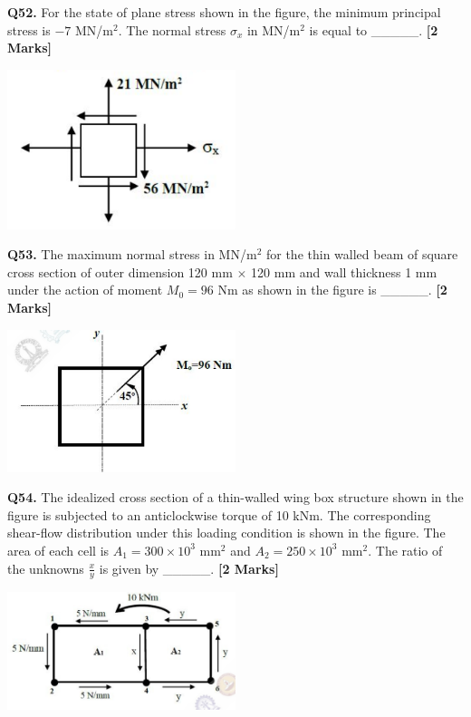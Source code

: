 \documentclass[11pt]{article}
\newcommand{\questionb}[2]{
    \noindent\textbf{Q#2.} #1 \hfill \textbf{[2 Marks]}
}
\begin{document}
\questionb{For the state of plane stress shown in the figure, the minimum principal stress is $-7$ MN/m$^2$. The normal stress $\sigma_x$ in MN/m$^2$ is equal to \_\_\_\_\_.}{52}
\begin{center}
\includegraphics[width=0.5\textwidth]{figures/52.png}
\end{center}

\vspace{0.5cm}

\questionb{The maximum normal stress in MN/m$^2$ for the thin walled beam of square cross section of outer dimension 120 mm $\times$ 120 mm and wall thickness 1 mm under the action of moment $M_0=96$ Nm as shown in the figure is \_\_\_\_\_.}{53}
\begin{center}
\includegraphics[width=0.5\textwidth]{figures/53.png}
\end{center}

\vspace{0.5cm}

\questionb{The idealized cross section of a thin-walled wing box structure shown in the figure is subjected to an anticlockwise torque of 10 kNm. The corresponding shear-flow distribution under this loading condition is shown in the figure. The area of each cell is $A_1 = 300 \times 10^3$ mm$^2$ and $A_2 = 250 \times 10^3$ mm$^2$. The ratio of the unknowns $\frac{x}{y}$ is given by \_\_\_\_\_.}{54}
\begin{center}
\includegraphics[width=0.5\textwidth]{figures/54.png}
\end{center}
\end{document}
